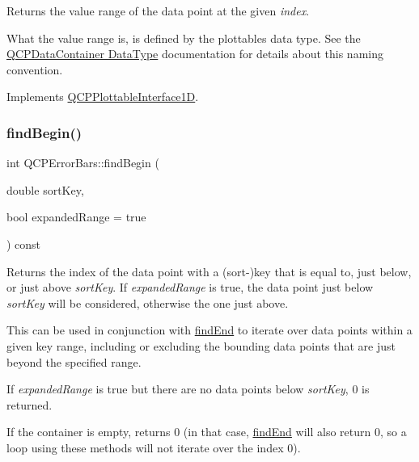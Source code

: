 Returns the value range of the data point at the given {\itshape index}.

What the value range is, is defined by the plottable\textquotesingle{}s data type. See the \hyperlink{class_q_c_p_data_container_qcpdatacontainer-datatype}{Q\+C\+P\+Data\+Container Data\+Type} documentation for details about this naming convention. 

Implements \hyperlink{class_q_c_p_plottable_interface1_d_a9ca7fcf14d885a200879768679b19be9}{Q\+C\+P\+Plottable\+Interface1D}.

\mbox{\label{class_q_c_p_error_bars_a5c74b510f1d7254263ec18cd3a359a07}} 
\subsubsection{\texorpdfstring{find\+Begin()}{findBegin()}\hspace{0.1cm}{\footnotesize\ttfamily [1/2]}}
{\footnotesize\ttfamily int Q\+C\+P\+Error\+Bars\+::find\+Begin (\begin{DoxyParamCaption}\item[{double}]{sort\+Key,  }\item[{bool}]{expanded\+Range = {\ttfamily true} }\end{DoxyParamCaption}) const\hspace{0.3cm}{\ttfamily [virtual]}}

Returns the index of the data point with a (sort-\/)key that is equal to, just below, or just above {\itshape sort\+Key}. If {\itshape expanded\+Range} is true, the data point just below {\itshape sort\+Key} will be considered, otherwise the one just above.

This can be used in conjunction with \hyperlink{class_q_c_p_error_bars_a64629f13bb290d41dd8f1b37346bfdd4}{find\+End} to iterate over data points within a given key range, including or excluding the bounding data points that are just beyond the specified range.

If {\itshape expanded\+Range} is true but there are no data points below {\itshape sort\+Key}, 0 is returned.

If the container is empty, returns 0 (in that case, \hyperlink{class_q_c_p_error_bars_a64629f13bb290d41dd8f1b37346bfdd4}{find\+End} will also return 0, so a loop using these methods will not iterate over the index 0).

